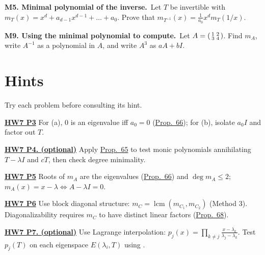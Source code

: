 \documentclass[10pt]{scrartcl}
\begin{document}
\begin{prob}
\textbf{M5. Minimal polynomial of the inverse.}\ Let $T$ be invertible with $m_T(x)=x^d+a_{d-1}x^{d-1}+\dots+a_0$. Prove that $m_{T^{-1}}(x)=\frac1{a_0}x^dm_T(1/x)$.
\end{prob}

\begin{prob}
\textbf{M9. Using the minimal polynomial to compute.}\ Let $A=\begin{psmallmatrix}1&2\\3&4\end{psmallmatrix}$. Find $m_A$, write $A^{-1}$ as a polynomial in $A$, and write $A^3$ as $aA+bI$.
\end{prob}

\bigskip
\section*{Hints}
Try each problem before consulting its hint.

\par\medskip\noindent\textbf{\hyperlink{prob-HW7-P3}{HW7 P3}} For (a), $0$ is an eigenvalue iff $a_0=0$ (\hyperref[prop-66]{Prop.~66}); for (b), isolate $a_0I$ and factor out $T$.

\par\medskip\noindent\textbf{\hyperlink{prob-HW7-P4}{HW7 P4. (optional)}} Apply \hyperref[prop-65]{Prop.~65} to test monic polynomials annihilating $T-\lambda I$ and $cT$, then check degree minimality.

\par\medskip\noindent\textbf{\hyperlink{prob-HW7-P5}{HW7 P5}} Roots of $m_A$ are the eigenvalues (\hyperref[prop-66]{Prop.~66}) and $\deg m_A\le 2$; $m_A(x)=x-\lambda\iff A-\lambda I=0$.

\par\medskip\noindent\textbf{\hyperlink{prob-HW7-P6}{HW7 P6}} Use block diagonal structure: $m_C=\operatorname{lcm}(m_{C_1},m_{C_2})$ (Method 3). Diagonalizability requires $m_C$ to have distinct linear factors (\hyperref[prop-68]{Prop.~68}).

\par\medskip\noindent\textbf{\hyperlink{prob-HW7-P7}{HW7 P7. (optional)}} Use Lagrange interpolation: $p_j(x)=\prod_{k\ne j}\frac{x-\lambda_k}{\lambda_j-\lambda_k}$. Test $p_j(T)$ on each eigenspace $E(\lambda_i,T)$ using .
\end{document}
